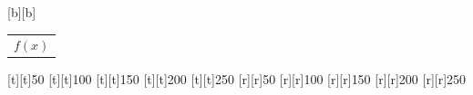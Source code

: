 %    
%
%
\begin{psfrags}%
\psfragscanon%
%
[b][b]{\color[rgb]{0,0,0}\setlength{\tabcolsep}{0pt}\begin{tabular}{c}$f(x)$\end{tabular}}%
%
[t][t]{50}%
[t][t]{100}%
[t][t]{150}%
[t][t]{200}%
[t][t]{250}%
%
[r][r]{50}%
[r][r]{100}%
[r][r]{150}%
[r][r]{200}%
[r][r]{250}%
%
%
\end{psfrags}%
%

